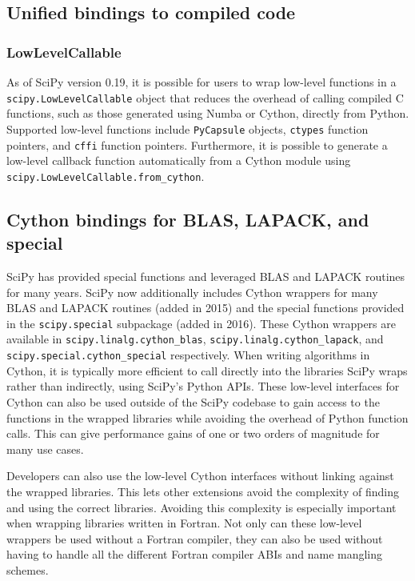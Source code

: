 \documentclass[fleqn,10pt]{wlscirep}
\begin{document}


\subsection*{Unified bindings to compiled code}

\subsubsection*{LowLevelCallable}

As of SciPy version 0.19, it is possible for users to wrap low-level functions
in a \texttt{scipy.LowLevelCallable} object that reduces the overhead of
calling compiled C functions, such as those generated using Numba
or Cython, directly from Python.
Supported low-level functions include \texttt{PyCapsule}
objects, \texttt{ctypes} function pointers, and \texttt{cffi} function pointers.
Furthermore, it is possible to generate a low-level callback function
automatically from a Cython module using \texttt{scipy.LowLevelCallable.from\_cython}.

\subsection*{Cython bindings for BLAS, LAPACK, and special}

SciPy has provided special functions and leveraged BLAS and
LAPACK\cite{LAPACK} routines for many years. SciPy now additionally
includes Cython\cite{behnel2011cython} wrappers for
many BLAS and LAPACK routines (added in 2015) and the special functions
provided in the \texttt{scipy.{\allowbreak}special} subpackage (added in 2016).
These Cython wrappers are available in
\texttt{scipy.{\allowbreak}linalg.{\allowbreak}cython\_blas},
\texttt{scipy.{\allowbreak}linalg.{\allowbreak}cython\_lapack}, and
\texttt{scipy.{\allowbreak}special.{\allowbreak}cython\_special} respectively.
When writing algorithms in Cython, it is typically more efficient to call
directly into the libraries SciPy wraps rather than indirectly, using SciPy's
Python APIs.  These low-level interfaces for Cython can also be used outside of
the SciPy codebase to gain access to the functions in the wrapped libraries
while avoiding the overhead of Python function calls.  This can give
performance gains of one or two orders of magnitude for many use cases.

Developers can also use the low-level Cython interfaces without linking against
the wrapped libraries\cite{blas-lapack-wrappers-scipy-2015}.  This lets other
extensions avoid the complexity of finding and using the correct libraries.
Avoiding this complexity is especially important when wrapping libraries
written in Fortran.  Not only can these low-level wrappers be used without a
Fortran compiler, they can also be used without having to handle all the
different Fortran compiler ABIs and name mangling schemes.
\end{document}
